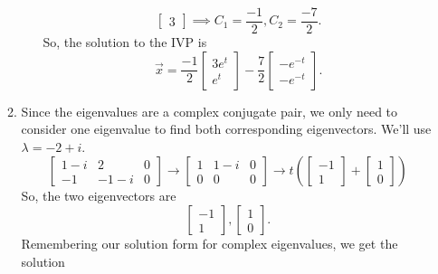 \begin{enumerate}[label=\arabic*.]
\begin{enumerate}[label=(\alph*)]
\begin{enumerate}[label=(\roman*)]
\begin{equation*}
\begin{bmatrix}
									3
								\end{bmatrix} \implies C_1 = \frac{-1}{2}, C_2 = \frac{-7}{2}.
							\end{equation*}
							So, the solution to the IVP is
							\begin{equation*}
								\vec{x} = \frac{-1}{2} \begin{bmatrix}
									3e^t \\
									e^t
								\end{bmatrix} - \frac{7}{2} \begin{bmatrix}
									-e^{-t} \\
									-e^{-t}
								\end{bmatrix}. 
							\end{equation*}
					\end{enumerate}
				\item
					Since the eigenvalues are a complex conjugate pair, we only need to consider one eigenvalue to find both corresponding eigenvectors.
					We'll use $\lambda = -2 + i$.
					\begin{equation*}
						\left[
							\begin{array}{cc|c}
								1-i & 2 & 0 \\
								-1 & -1-i & 0
							\end{array}
						\right] \to \left[
							\begin{array}{cc|c}
								1 & 1-i & 0 \\
								0 & 0 & 0
							\end{array}
						\right] \to t\left(\begin{bmatrix}
							-1 \\
							1
						\end{bmatrix} + \begin{bmatrix}
							1 \\
							0
						\end{bmatrix}\right)
					\end{equation*}
					So, the two eigenvectors are
					\begin{equation*}
						\begin{bmatrix}
						-1 \\
						1
						\end{bmatrix}, \begin{bmatrix}
						1 \\
						0
						\end{bmatrix}.
					\end{equation*}
					Remembering our solution form for complex eigenvalues, we get the solution

\end{enumerate}
\end{enumerate}
